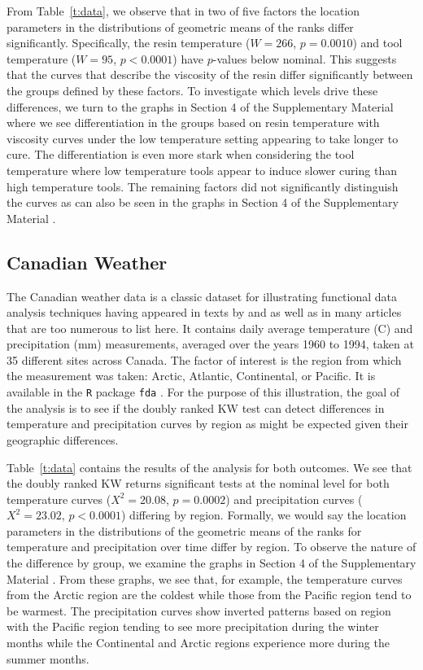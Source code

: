 \documentclass[12pt]{article}
\theoremstyle{plain}
\begin{document}
From Table~\ref{t:data}, we observe that in two of five factors the location parameters in the distributions of geometric means of the ranks differ significantly. Specifically, the resin temperature ($W = 266$, $p = 0.0010$) and tool temperature ($W = 95$, $p < 0.0001$) have $p$-values below nominal. This suggests that the curves that describe the viscosity of the resin differ significantly between the groups defined by these factors. To investigate which levels drive these differences, we turn to the graphs in Section 4 of the Supplementary Material where we see differentiation in the groups based on resin temperature with viscosity curves under the low temperature setting appearing to take longer to cure. The differentiation is even more stark when considering the tool temperature where low temperature tools appear to induce slower curing than high temperature tools. The remaining factors did not significantly distinguish the curves as can also be seen in the graphs in Section 4 of the Supplementary Material \citep{DRTSup2023}.

\subsection{Canadian Weather}

The Canadian weather data is a classic dataset for illustrating functional data analysis techniques having appeared in texts by \cite{Ramsay2005} and \cite{Ramsay2009} as well as in many articles that are too numerous to list here. It contains daily average temperature (C) and precipitation (mm) measurements, averaged over the years 1960 to 1994, taken at 35 different sites across Canada. The factor of interest is the region from which the measurement was taken: Arctic, Atlantic, Continental, or Pacific. It is available in the \texttt{R} package \texttt{fda} \citep{fda2022}. For the purpose of this illustration, the goal of the analysis is to see if the doubly ranked KW test can detect differences in temperature and precipitation curves by region as might be expected given their geographic differences.

Table~\ref{t:data} contains the results of the analysis for both outcomes. We see that the doubly ranked KW returns significant tests at the nominal level for both temperature curves ($X^2 = 20.08$, $p = 0.0002$) and precipitation curves ($X^2 = 23.02$, $p < 0.0001$) differing by region. Formally, we would say the location parameters in the distributions of the geometric means of the ranks for temperature and precipitation over time differ by region. To observe the nature of the difference by group, we examine the graphs in Section 4 of the Supplementary Material \citep{DRTSup2023}. From these graphs, we see that, for example, the temperature curves from the Arctic region are the coldest while those from the Pacific region tend to be warmest. The precipitation curves show inverted patterns based on region with the Pacific region tending to see more precipitation during the winter months while the Continental and Arctic regions experience more during the summer months.
\end{document}
